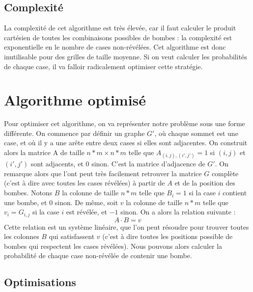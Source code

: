 \subsection{Complexité}

La complexité de cet algorithme est très élevée, car il faut calculer le produit cartésien de toutes les combinaisons possibles de bombes : la complexité est exponentielle en le nombre de cases non-révélées.
Cet algorithme est donc inutilisable pour des grilles de taille moyenne.
\newline
Si on veut calculer les probabilités de chaque case, il va falloir radicalement optimiser cette stratégie.

\section{Algorithme optimisé}

Pour optimiser cet algorithme, on va représenter notre problème sous une forme différente. 
\newline
On commence par définir un graphe $G'$, où chaque sommet est une case, et où il y a une arête entre deux cases si elles sont adjacentes.
On construit alors la matrice A de taille $n*m \times n*m$ telle que $A_{(i, j), (i', j')} = 1$ si ${(i, j)}$ et ${(i', j')}$ sont adjacents, et $0$ sinon. C'est la matrice d'adjacence de $G'$.
\newline
On remarque alors que l'ont peut très facilement retrouver la matrice $G$ complète (c'est à dire avec toutes les cases révélées) à partir de $A$ et de la position des bombes.
\newline
\newline
Notons $B$ la colonne de taille $n*m$ telle que $B_i = 1$ si la case $i$ contient une bombe, et $0$ sinon.
De même, soit $v$ la colonne de taille $n*m$ telle que $v_i = G_{i,j}$ si la case $i$ est révélée, et $-1$ sinon.
\newline
\newline
On a alors la relation suivante :
\[
A \cdot B = v
\]
\newline
Cette relation est un système linéaire, que l'on peut résoudre pour trouver toutes les colonnes $B$ qui satisfassent $v$ (c'est à dire toutes les positions possible de bombes qui respectent les cases révélées).
Nous pouvons alors calculer la probabilité de chaque case non-révélée de contenir une bombe.

\subsection{Optimisations}

